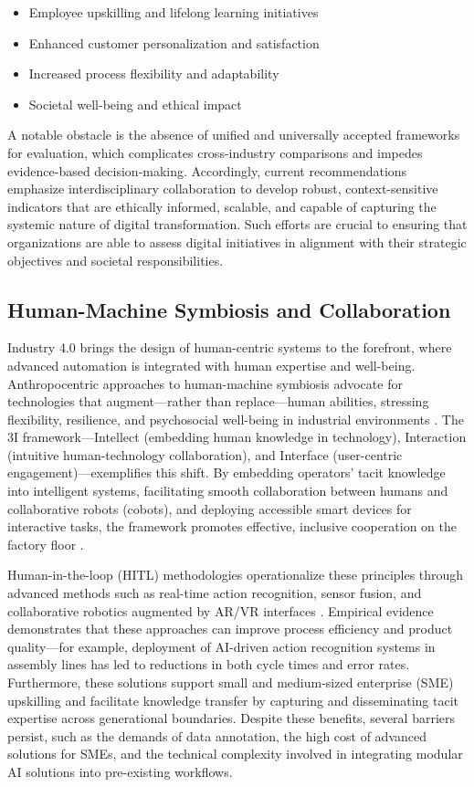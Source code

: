 \documentclass[sigconf]{acmart}
\begin{document}
\begin{itemize}
    \item Employee upskilling and lifelong learning initiatives
    \item Enhanced customer personalization and satisfaction
    \item Increased process flexibility and adaptability
    \item Societal well-being and ethical impact
\end{itemize}

A notable obstacle is the absence of unified and universally accepted frameworks for evaluation, which complicates cross-industry comparisons and impedes evidence-based decision-making. Accordingly, current recommendations emphasize interdisciplinary collaboration to develop robust, context-sensitive indicators that are ethically informed, scalable, and capable of capturing the systemic nature of digital transformation. Such efforts are crucial to ensuring that organizations are able to assess digital initiatives in alignment with their strategic objectives and societal responsibilities.

\subsection{Human-Machine Symbiosis and Collaboration}

Industry 4.0 brings the design of human-centric systems to the forefront, where advanced automation is integrated with human expertise and well-being. Anthropocentric approaches to human-machine symbiosis advocate for technologies that augment—rather than replace—human abilities, stressing flexibility, resilience, and psychosocial well-being in industrial environments \cite{ref90}. The 3I framework—Intellect (embedding human knowledge in technology), Interaction (intuitive human-technology collaboration), and Interface (user-centric engagement)—exemplifies this shift. By embedding operators’ tacit knowledge into intelligent systems, facilitating smooth collaboration between humans and collaborative robots (cobots), and deploying accessible smart devices for interactive tasks, the framework promotes effective, inclusive cooperation on the factory floor \cite{ref90}.

Human-in-the-loop (HITL) methodologies operationalize these principles through advanced methods such as real-time action recognition, sensor fusion, and collaborative robotics augmented by AR/VR interfaces \cite{ref17,ref27,ref29,ref37,ref38,ref42,ref43,ref45,ref46,ref54,ref89}. Empirical evidence demonstrates that these approaches can improve process efficiency and product quality—for example, deployment of AI-driven action recognition systems in assembly lines has led to reductions in both cycle times and error rates. Furthermore, these solutions support small and medium-sized enterprise (SME) upskilling and facilitate knowledge transfer by capturing and disseminating tacit expertise across generational boundaries. Despite these benefits, several barriers persist, such as the demands of data annotation, the high cost of advanced solutions for SMEs, and the technical complexity involved in integrating modular AI solutions into pre-existing workflows.
\end{document}
